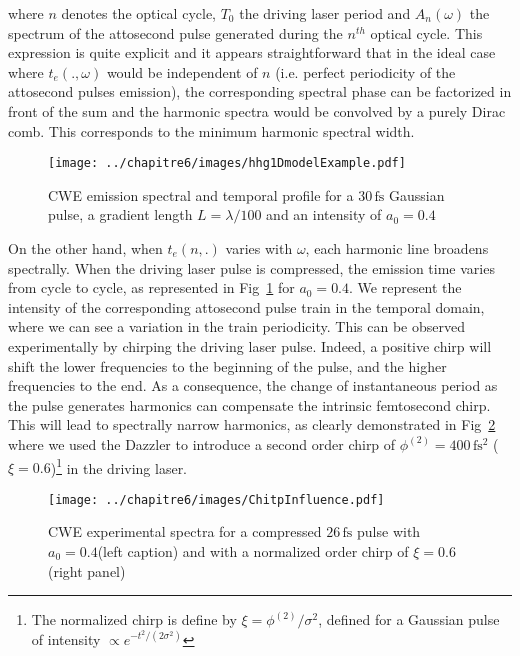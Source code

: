 \noindent where $n$ denotes the optical cycle, $T_0$ the driving laser period and $A_n(\omega)$ the spectrum of the attosecond pulse generated during the $n^{th}$ optical cycle. This expression is quite explicit and it appears straightforward that in the ideal case where $t_e(.,\omega)$ would be independent of $n$ (i.e. perfect periodicity of the attosecond pulses emission), the corresponding spectral phase can be factorized in front of the sum and the harmonic spectra would be convolved by a purely Dirac comb. This corresponds to the minimum harmonic spectral width. 

\begin{figure}[H]
\centering
\texttt{[image: ../chapitre6/images/hhg1DmodelExample.pdf]}\\
\caption{\label{fig:hhg1DmodelExample} CWE emission spectral and temporal profile for a $30\,\mathrm{fs}$ Gaussian pulse, a gradient length $L= \lambda / 100$ and an intensity of $a_0 = 0.4$ }
\end{figure}

\noindent On the other hand, when $t_e(n,.)$ varies with $\omega$, each harmonic line broadens spectrally. When the driving laser pulse is compressed, the emission time varies from cycle to cycle, as represented in Fig~\ref{fig:hhg1DmodelExample} for $a_0 = 0.4$. We represent the intensity of the corresponding attosecond pulse train in the temporal domain, where we can see a variation in the train periodicity. This can be observed experimentally by chirping the driving laser pulse. Indeed, a positive chirp will shift the lower frequencies to the beginning of the pulse, and the higher frequencies to the end. As a consequence, the change of instantaneous period as the pulse generates harmonics can compensate the intrinsic femtosecond chirp. This will lead to spectrally narrow harmonics, as clearly demonstrated in Fig~\ref{fig:ChitpInfluence} where we used the Dazzler to introduce a second order chirp of $\phi^{(2)} = 400\,\mathrm{fs^2}$ ($\xi = 0.6$)\footnote{The normalized chirp is define by $\xi = \phi^{(2)}/\sigma^2$, defined for a Gaussian pulse of intensity $\propto e^{-t^2/(2\sigma^2)}$} in the driving laser.

\begin{figure}[H]
\centering
\texttt{[image: ../chapitre6/images/ChitpInfluence.pdf]}\\
\caption{\label{fig:ChitpInfluence} CWE experimental  spectra for a compressed $26\,\mathrm{fs}$ pulse with $a_0 = 0.4$(left caption) and with a normalized order chirp of $\xi = 0.6$ (right panel)}
\end{figure}


